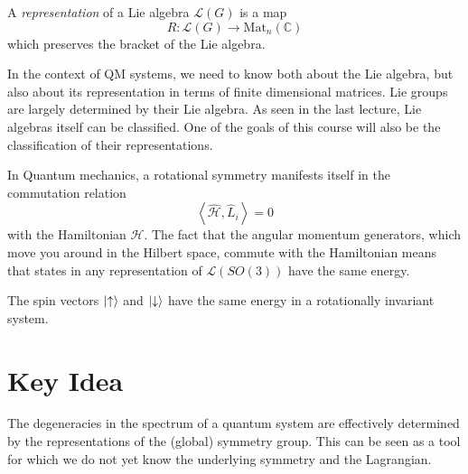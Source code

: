 \begin{definition}[Representation]
  A \emph{representation} of a Lie algebra $\mathscr{L}(G)$ is a map
  \begin{equation}
    R \colon \mathscr{L}(G) \to \text{Mat}_n (\mathbb{C})
  \end{equation}
  which preserves the bracket of the Lie algebra.
\end{definition}

\begin{leftbar}
  \begin{remark}
    In the context of QM systems, we need to know both about the Lie algebra, but also about its representation in terms of finite dimensional matrices.
    Lie groups are largely determined by their Lie algebra. As seen in the last lecture, Lie algebras itself can be classified. One of the goals of this course will also be the classification of their representations.
  \end{remark}
\end{leftbar}

In Quantum mechanics, a rotational symmetry manifests itself in the commutation relation
\begin{equation}
  \left\langle \hat{\mathcal{H}}, \hat L_i \right\rangle = 0
\end{equation}
with the Hamiltonian $\mathcal{H}$. The fact that the angular momentum generators, which move you around in the Hilbert space, commute with the Hamiltonian means that states in any representation of $\mathscr{L}(SO(3))$ have the same energy.

\begin{example}[]
The spin vectors $\ket{\uparrow}$ and $\ket{\downarrow}$ have the same energy in a rotationally invariant system.
\end{example}

\section{Key Idea}%
\label{sec:key-idea}

The degeneracies in the spectrum of a quantum system are effectively determined by the representations of the (global) symmetry group.
This can be seen as a tool for which we do not yet know the underlying symmetry and the Lagrangian.

